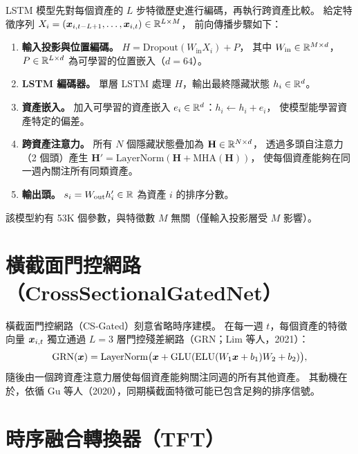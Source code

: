 LSTM 模型先對每個資產的 $L$ 步特徵歷史進行編碼，再執行跨資產比較。
給定特徵序列 $X_i = (\bm{x}_{i,t-L+1}, \dots, \bm{x}_{i,t}) \in \mathbb{R}^{L \times M}$，
前向傳播步驟如下：

\begin{enumerate}[nosep]
  \item \textbf{輸入投影與位置編碼。}
        $H = \mathrm{Dropout}(W_\text{in} X_i) + P$，
        其中 $W_\text{in} \in \mathbb{R}^{M \times d}$，
        $P \in \mathbb{R}^{L \times d}$ 為可學習的位置嵌入（$d=64$）。

  \item \textbf{LSTM 編碼器。}
        單層 LSTM 處理 $H$，輸出最終隱藏狀態 $h_i \in \mathbb{R}^d$。

  \item \textbf{資產嵌入。}
        加入可學習的資產嵌入 $e_i \in \mathbb{R}^d$：$h_i \leftarrow h_i + e_i$，
        使模型能學習資產特定的偏差。

  \item \textbf{跨資產注意力。}
        所有 $N$ 個隱藏狀態疊加為 $\mathbf{H} \in \mathbb{R}^{N \times d}$，
        透過多頭自注意力（2 個頭）產生
        $\mathbf{H}' = \mathrm{LayerNorm}(\mathbf{H} + \mathrm{MHA}(\mathbf{H}))$，
        使每個資產能夠在同一週內關注所有同類資產。

  \item \textbf{輸出頭。}
        $s_i = W_\text{out} h'_i \in \mathbb{R}$ 為資產 $i$ 的排序分數。
\end{enumerate}

\noindent 該模型約有 53K 個參數，與特徵數 $M$ 無關（僅輸入投影層受 $M$ 影響）。

\section{橫截面門控網路（CrossSectionalGatedNet）}
\label{sec:method:csgated}

橫截面門控網路（CS-Gated）刻意省略時序建模。
在每一週 $t$，每個資產的特徵向量 $\bm{x}_{i,t}$ 獨立通過
$L = 3$ 層門控殘差網路（GRN；Lim 等人，2021）：
\begin{equation}
  \mathrm{GRN}(\bm{x}) = \mathrm{LayerNorm}\bigl(\bm{x} + \mathrm{GLU}(\mathrm{ELU}(W_1 \bm{x} + b_1) W_2 + b_2)\bigr),
\end{equation}
隨後由一個跨資產注意力層使每個資產能夠關注同週的所有其他資產。
其動機在於，依循 Gu 等人（2020），同期橫截面特徵可能已包含足夠的排序信號。

\section{時序融合轉換器（TFT）}
\label{sec:method:tft}

